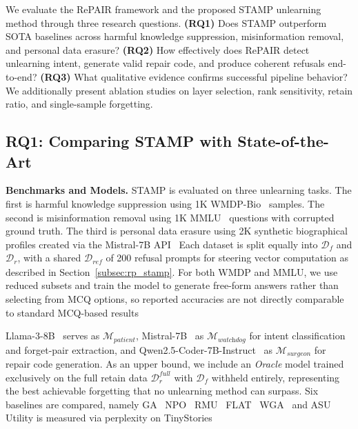 We evaluate the RePAIR framework and the proposed STAMP unlearning method through three research questions. \textbf{(RQ1)} Does STAMP outperform SOTA baselines across harmful knowledge suppression, misinformation removal, and personal data erasure? \textbf{(RQ2)} How effectively does RePAIR detect unlearning intent, generate valid repair code, and produce coherent refusals end-to-end? \textbf{(RQ3)} What qualitative evidence confirms successful pipeline behavior? We additionally present ablation studies on layer selection, rank sensitivity, retain ratio, and single-sample forgetting.

\subsection{RQ1: Comparing STAMP with State-of-the-Art}\label{subsec:rp_rq1}

\noindent
\textbf{Benchmarks and Models.}
STAMP is evaluated on three unlearning tasks. The first is harmful knowledge suppression using 1K WMDP-Bio~\citeauthor{li2024wmdp} samples. The second is misinformation removal using 1K MMLU~\citeauthor{hendrycks2020measuring} questions with corrupted ground truth. The third is personal data erasure using 2K synthetic biographical profiles created via the Mistral-7B API~\citeauthor{Jiang2023Mistral7} Each dataset is split equally into $\mathcal{D}_f$ and $\mathcal{D}_r$, with a shared $\mathcal{D}_{\textit{ref}}$ of 200 refusal prompts for steering vector computation as described in Section~\ref{subsec:rp_stamp}. For both WMDP and MMLU, we use reduced subsets and train the model to generate free-form answers rather than selecting from MCQ options, so reported accuracies are not directly comparable to standard MCQ-based results~\citeauthor{grattafiori2024llama}

Llama-3-8B~\citeauthor{grattafiori2024llama} serves as $\mathcal{M}_{\textit{patient}}$, Mistral-7B~\citeauthor{Jiang2023Mistral7} as $\mathcal{M}_{\textit{watchdog}}$ for intent classification and forget-pair extraction, and Qwen2.5-Coder-7B-Instruct~\citeauthor{hui2024qwen2} as $\mathcal{M}_{\textit{surgeon}}$ for repair code generation. As an upper bound, we include an \textit{Oracle} model trained exclusively on the full retain data $\mathcal{D}_r^{\textit{full}}$ with $\mathcal{D}_f$ withheld entirely, representing the best achievable forgetting that no unlearning method can surpass. Six baselines are compared, namely GA~\citeauthor{yao2024large} NPO~\citeauthor{zhang2024negative} RMU~\citeauthor{li2024wmdp} FLAT~\citeauthor{wang2024llm} WGA~\citeauthor{wang2025rethinking} and ASU~\citeauthor{zade2026attention} Utility is measured via perplexity on TinyStories~\citeauthor{eldan2023tinystories}

